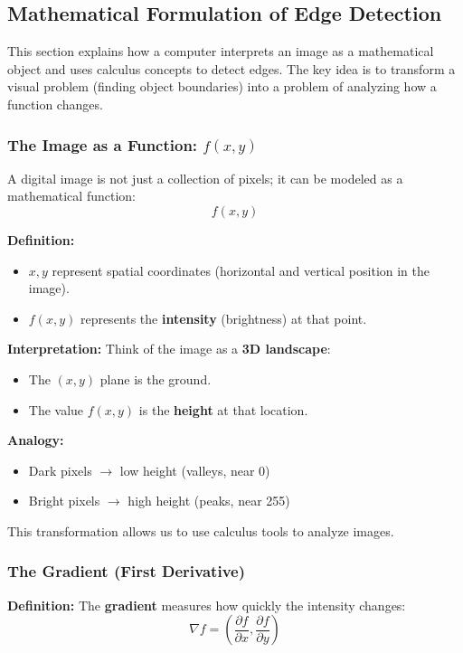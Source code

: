 \documentclass[12pt]{article}
\begin{document}
\subsection{Mathematical Formulation of Edge Detection}

This section explains how a computer interprets an image as a mathematical object and uses calculus concepts to detect edges. The key idea is to transform a visual problem (finding object boundaries) into a problem of analyzing how a function changes.

\subsubsection{The Image as a Function: $f(x,y)$}

A digital image is not just a collection of pixels; it can be modeled as a mathematical function:
\[
    f(x,y)
\]

\textbf{Definition:}
\begin{itemize}
    \item $x, y$ represent spatial coordinates (horizontal and vertical position in the image).
    \item $f(x,y)$ represents the \textbf{intensity} (brightness) at that point.
\end{itemize}

\textbf{Interpretation:}
Think of the image as a \textbf{3D landscape}:
\begin{itemize}
    \item The $(x,y)$ plane is the ground.
    \item The value $f(x,y)$ is the \textbf{height} at that location.
\end{itemize}

\textbf{Analogy:}
\begin{itemize}
    \item Dark pixels $\rightarrow$ low height (valleys, near 0)
    \item Bright pixels $\rightarrow$ high height (peaks, near 255)
\end{itemize}

This transformation allows us to use calculus tools to analyze images.

\subsubsection{The Gradient (First Derivative)}

\textbf{Definition:}
The \textbf{gradient} measures how quickly the intensity changes:
\[
    \nabla f = \left( \frac{\partial f}{\partial x}, \frac{\partial f}{\partial y} \right)
\]
\end{document}
